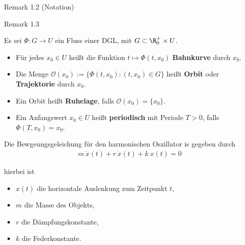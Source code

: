 \documentclass[letterpaper,10pt,english]{jupyterBook}
\begin{document}
\begin{emphBox}{}{}{Remark 1.2 (Notation)}
\begin{emphBox}{}{}{Remark 1.3}
\begin{definition}{}{}
\par
Es sei \(\Phi:G\rightarrow U\) ein Fluss einer DGL, mit \(G\subset \R^+_0\times U\).
\begin{itemize}
\item {} 
\par
Für jedes \(x_0\in U\) heißt die Funktion \(t\mapsto \Phi(t, x_0)\) \textbf{Bahnkurve} durch \(x_0\).

\item {} 
\par
Die Menge \(\mathcal{O}(x_0) := \{\Phi(t, x_0): (t, x_0)\in G\}\) heißt \textbf{Orbit} oder \textbf{Trajektorie} durch \(x_0\).

\item {} 
\par
Ein Orbit heißt \textbf{Ruhelage}, falls \(\mathcal{O}(x_0) = \{x_0\}\).

\item {} 
\par
Ein Anfangswert \(x_0\in U\) heißt \textbf{periodisch} mit Periode \(T>0\), falls \(\Phi(T, x_0) = x_0\).

\end{itemize}
\end{definition}
\label{ode/fluesse:example-6}
\begin{example}{}{}



\par
Die Bewgeungsgeleichung für den harmonischen Oszillator is gegeben durch
\begin{align*}
m~\ddot{x}(t) + r~\dot{x}(t) + k~x(t)=0
\end{align*}
\par
hierbei ist
\begin{itemize}
\item {} 
\par
\(x(t)\) die horizontale Auslenkung zum Zeitpunkt \(t\),

\item {} 
\par
\(m\) die Masse des Objekts,

\item {} 
\par
\(r\) die Dämpfungskonstante,

\item {} 
\par
\(k\) die Federkonstante.

\end{itemize}


\end{example}
\end{emphBox}
\end{emphBox}
\end{document}
